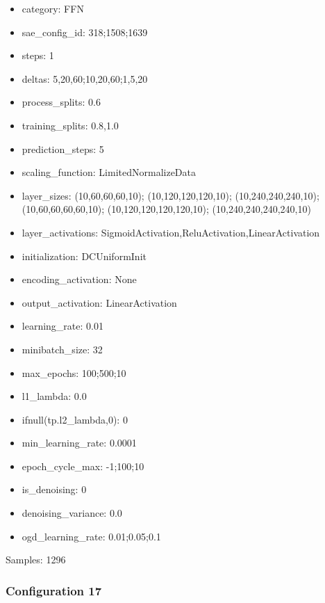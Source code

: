 \documentclass[a4paper,11pt,oneside]{article}
\theoremstyle{plain}
\theoremstyle{definition}
\begin{document}
	\begin{itemize}
		\item category: FFN
		\item sae\_config\_id: 318;1508;1639
		\item steps: 1
		\item deltas: 5,20,60;10,20,60;1,5,20
		\item process\_splits: 0.6
		\item training\_splits: 0.8,1.0
		\item prediction\_steps: 5
		\item scaling\_function: LimitedNormalizeData
		\item layer\_sizes: (10,60,60,60,10); (10,120,120,120,10); (10,240,240,240,10); (10,60,60,60,60,10); (10,120,120,120,120,10); (10,240,240,240,240,10)
		\item layer\_activations: SigmoidActivation,ReluActivation,LinearActivation
		\item initialization: DCUniformInit
		\item encoding\_activation: None
		\item output\_activation: LinearActivation
		\item learning\_rate: 0.01
		\item minibatch\_size: 32
		\item max\_epochs: 100;500;10
		\item l1\_lambda: 0.0
		\item ifnull(tp.l2\_lambda,0): 0
		\item min\_learning\_rate: 0.0001
		\item epoch\_cycle\_max: -1;100;10
		\item is\_denoising: 0
		\item denoising\_variance: 0.0
		\item ogd\_learning\_rate: 0.01;0.05;0.1
	\end{itemize}
	
	Samples: 1296
	
	\subsubsection{Configuration 17}\label{config17}
	
\end{document}
